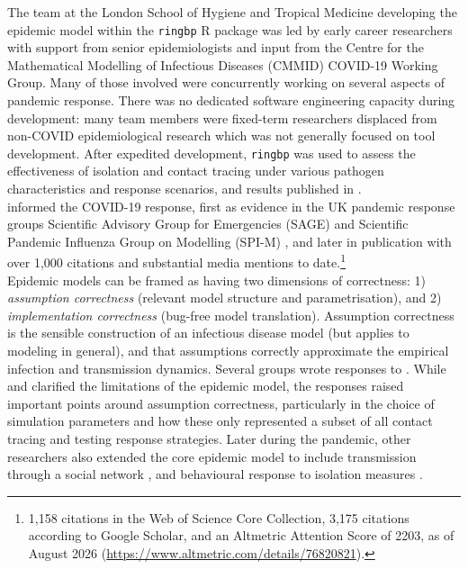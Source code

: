 \documentclass[12pt, letterpaper]{article}
\begin{document}
The team at the London School of Hygiene and Tropical Medicine developing the epidemic model within the \texttt{ringbp} R package was led by early career researchers with support from senior epidemiologists and input from the Centre for the Mathematical Modelling of Infectious Diseases (CMMID) COVID-19 Working Group. Many of those involved were concurrently working on several aspects of pandemic response. There was no dedicated software engineering capacity during development: many team members were fixed-term researchers displaced from non-COVID epidemiological research which was not generally focused on tool development. After expedited development, \texttt{ringbp} was used to assess the effectiveness of isolation and contact tracing under various pathogen characteristics and response scenarios, and results published in \cite{Hellewell2020}. \\

\cite{Hellewell2020} informed the COVID-19 response, first as evidence in the UK pandemic response groups Scientific Advisory Group for Emergencies (SAGE) and Scientific Pandemic Influenza Group on Modelling (SPI-M) \citep{Kucharski2020a}, and later in publication with over 1,000 citations and substantial media mentions to date.\footnote{1,158 citations in the Web of Science Core Collection, 3,175 citations according to Google Scholar, and an Altmetric Attention Score of 2203, as of August 2026 (\url{https://www.altmetric.com/details/76820821}).} \\

Epidemic models can be framed as having two dimensions of correctness: 1) \textit{assumption correctness} (relevant model structure and parametrisation), and 2) \textit{implementation correctness} (bug-free model translation). Assumption correctness is the sensible construction of an infectious disease model (but applies to modeling in general), and that assumptions correctly approximate the empirical infection and transmission dynamics. Several groups wrote responses to \cite{Hellewell2020} \citep{Gurdasani2020, Mitj2020, Xiong2020}. While \cite{Eggo2020} and \cite{Hellewell2020b} clarified the limitations of the epidemic model, the responses raised important points around assumption correctness, particularly in the choice of simulation parameters and how these only represented a subset of all contact tracing and testing response strategies. Later during the pandemic, other researchers also extended the core epidemic model to include transmission through a social network \citep{Firth2020}, and behavioural response to isolation measures \citep{Davis2021}. \\
\end{document}
